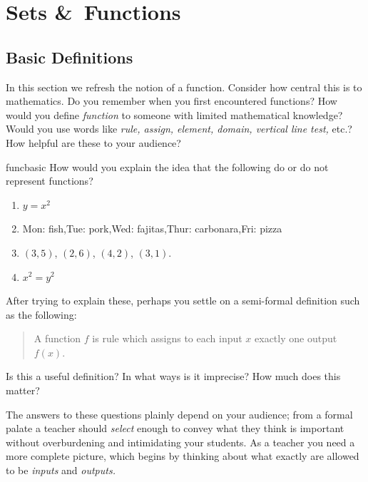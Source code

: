 \goodbreak

\section{Sets \&\ Functions}

\subsection{Basic Definitions}

In this section we refresh the notion of a function. Consider how central this is to mathematics. Do you remember when you first encountered functions? How would you define \emph{function} to someone with limited mathematical knowledge? Would you use words like \emph{rule, assign, element, domain, vertical line test,} etc.? How helpful are these to your audience?

\begin{examples}{}{funcbasic}
How would you explain the idea that the following do or do not represent functions?\vspace{-5pt}
\begin{enumerate}\itemsep0pt
  \item $y=x^2$
  \item Mon: fish,\quad Tue: pork,\quad Wed: fajitas,\quad Thur: carbonara,\quad Fri: pizza
  \item $(3,5)$, $(2,6)$, $(4,2)$, $(3,1)$.
  \item $x^2=y^2$
\end{enumerate}
\end{examples}

After trying to explain these, perhaps you settle on a semi-formal definition such as the following:
\begin{quote}
A function $f$ is rule which assigns to each input $x$ exactly one output $f(x)$.
\end{quote}
Is this a useful definition? In what ways is it imprecise? How much does this matter?\medbreak

The answers to these questions plainly depend on your audience; from a formal palate a teacher should \emph{select} enough to convey what they think is important without overburdening and intimidating your students. As a teacher you need a more complete picture, which begins by thinking about what exactly are allowed to be \emph{inputs} and \emph{outputs.}

